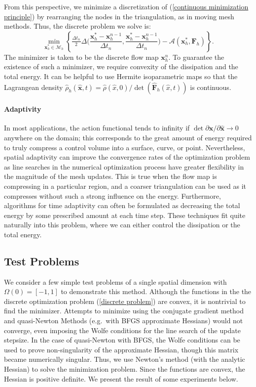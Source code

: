 \documentclass[final,10pt]{article}
\begin{document}
From this perspective, we minimize a discretization of (\ref{continuous minimization principle}) by rearranging the nodes in the triangulation,
as in moving mesh methods.
Thus, the discrete problem we solve is:
\begin{equation}	\label{discrete problem}
	\min_{\bm x_h^* \in \mathcal{M}_h} \left\{ \frac{_{\Delta t_n}}{^2}\Delta \bigg( \frac{\bm x_h^*-\bm x_h^{n-1}}{\Delta t_n},\frac{\bm x_h^*-\bm x_h^{n-1}}{\Delta t_n}\bigg)
			- \mathcal{A}(\bm x_h^*,\bm F_h) \right\}.
\end{equation}
The minimizer is taken to be the discrete flow map $\bm x_h^n$.
To guarantee the existence of such a minimizer, we require convexity of the dissipation and the total energy.
It can be helpful to use Hermite isoparametric maps so that the Lagrangean density $\hat{\rho}_h(\hat{\bm x},t) = \hat{\rho}(\hat{x},0)/\det(\hat{\bm F}_h(\hat{x},t))$
is continuous.

\paragraph{Adaptivity}
In most applications, the action functional tends to infinity if $\det \partial \bm x/ \partial\hat{\bm x} \rightarrow 0$ anywhere on the domain;
this corresponds to the great amount of energy required to truly compress a control volume into a surface, curve, or point.
Nevertheless, spatial adaptivity can improve the convergence rates of the optimization problem as line searches in the numerical optimization process
have greater flexibility in the magnitude of the mesh updates.
This is true when the flow map is compressing in a particular region, and a coarser triangulation can be used as it compresses without such a strong influence on the energy.
Furthermore, algorithms for time adaptivity can often be formulated as decreasing the total energy by some prescribed amount at each time step.
These techniques fit quite naturally into this problem, where we can either control the dissipation or the total energy.




\subsection{Test Problems}

We consider a few simple test problems of a single spatial dimension with $\Omega(0) = [-1,1]$ to demonstrate this method.
Although the functions in the the discrete optimization problem (\ref{discrete problem}) are convex, it is nontrivial to find the minimizer.
Attempts to minimize using the conjugate gradient method and quasi-Newton Methods (e.g.~with BFGS approximate Hessians) would
not converge, even imposing the Wolfe conditions for the line search of the update stepsize.
In the case of quasi-Newton with BFGS, the Wolfe conditions can be used to prove non-singularity of the approximate Hessian,
though this matrix became numerically singular.
Thus, we use Newton's method (with the analytic Hessian) to solve the minimization problem.
Since the functions are convex, the Hessian is positive definite.
We present the result of some experiments below.
\end{document}
